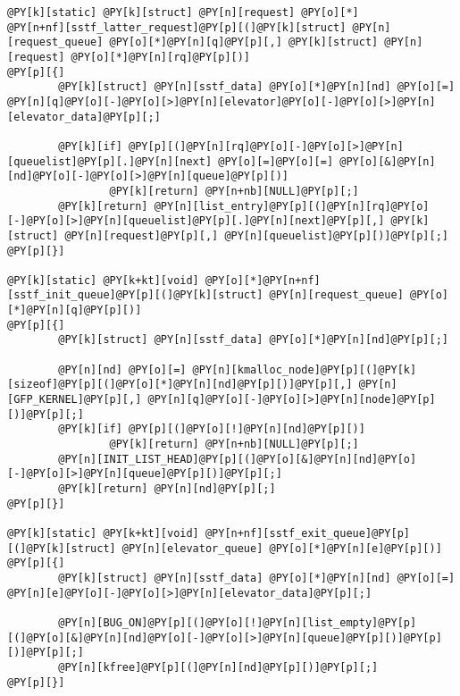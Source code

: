 \begin{Verbatim}[commandchars=@\[\]]
@PY[k][static] @PY[k][struct] @PY[n][request] @PY[o][*]
@PY[n+nf][sstf_latter_request]@PY[p][(]@PY[k][struct] @PY[n][request_queue] @PY[o][*]@PY[n][q]@PY[p][,] @PY[k][struct] @PY[n][request] @PY[o][*]@PY[n][rq]@PY[p][)]
@PY[p][{]
        @PY[k][struct] @PY[n][sstf_data] @PY[o][*]@PY[n][nd] @PY[o][=] @PY[n][q]@PY[o][-]@PY[o][>]@PY[n][elevator]@PY[o][-]@PY[o][>]@PY[n][elevator_data]@PY[p][;]

        @PY[k][if] @PY[p][(]@PY[n][rq]@PY[o][-]@PY[o][>]@PY[n][queuelist]@PY[p][.]@PY[n][next] @PY[o][=]@PY[o][=] @PY[o][&]@PY[n][nd]@PY[o][-]@PY[o][>]@PY[n][queue]@PY[p][)]
                @PY[k][return] @PY[n+nb][NULL]@PY[p][;]
        @PY[k][return] @PY[n][list_entry]@PY[p][(]@PY[n][rq]@PY[o][-]@PY[o][>]@PY[n][queuelist]@PY[p][.]@PY[n][next]@PY[p][,] @PY[k][struct] @PY[n][request]@PY[p][,] @PY[n][queuelist]@PY[p][)]@PY[p][;]
@PY[p][}]

@PY[k][static] @PY[k+kt][void] @PY[o][*]@PY[n+nf][sstf_init_queue]@PY[p][(]@PY[k][struct] @PY[n][request_queue] @PY[o][*]@PY[n][q]@PY[p][)]
@PY[p][{]
        @PY[k][struct] @PY[n][sstf_data] @PY[o][*]@PY[n][nd]@PY[p][;]

        @PY[n][nd] @PY[o][=] @PY[n][kmalloc_node]@PY[p][(]@PY[k][sizeof]@PY[p][(]@PY[o][*]@PY[n][nd]@PY[p][)]@PY[p][,] @PY[n][GFP_KERNEL]@PY[p][,] @PY[n][q]@PY[o][-]@PY[o][>]@PY[n][node]@PY[p][)]@PY[p][;]
        @PY[k][if] @PY[p][(]@PY[o][!]@PY[n][nd]@PY[p][)]
                @PY[k][return] @PY[n+nb][NULL]@PY[p][;]
        @PY[n][INIT_LIST_HEAD]@PY[p][(]@PY[o][&]@PY[n][nd]@PY[o][-]@PY[o][>]@PY[n][queue]@PY[p][)]@PY[p][;]
        @PY[k][return] @PY[n][nd]@PY[p][;]
@PY[p][}]

@PY[k][static] @PY[k+kt][void] @PY[n+nf][sstf_exit_queue]@PY[p][(]@PY[k][struct] @PY[n][elevator_queue] @PY[o][*]@PY[n][e]@PY[p][)]
@PY[p][{]
        @PY[k][struct] @PY[n][sstf_data] @PY[o][*]@PY[n][nd] @PY[o][=] @PY[n][e]@PY[o][-]@PY[o][>]@PY[n][elevator_data]@PY[p][;]

        @PY[n][BUG_ON]@PY[p][(]@PY[o][!]@PY[n][list_empty]@PY[p][(]@PY[o][&]@PY[n][nd]@PY[o][-]@PY[o][>]@PY[n][queue]@PY[p][)]@PY[p][)]@PY[p][;]
        @PY[n][kfree]@PY[p][(]@PY[n][nd]@PY[p][)]@PY[p][;]
@PY[p][}]


\end{Verbatim}
